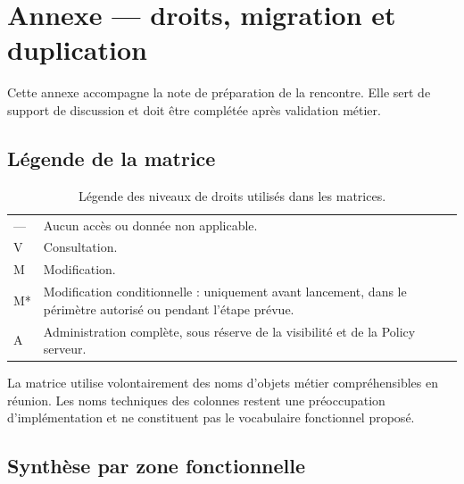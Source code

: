 \section{Annexe — droits, migration et duplication}

Cette annexe accompagne la note de préparation de la rencontre. Elle sert de support de discussion et doit être complétée après validation métier.

\subsection{Légende de la matrice}

\begin{table}[htbp]
\centering
\small
\begin{tabularx}{0.8\textwidth}{>{\centering\arraybackslash}p{1.2cm}Y}
\toprule
{}
 &  \\
\midrule
— & Aucun accès ou donnée non applicable. \\
V & Consultation. \\
M & Modification. \\
M* & Modification conditionnelle : uniquement avant lancement, dans le périmètre autorisé ou pendant l'étape prévue. \\
A & Administration complète, sous réserve de la visibilité et de la Policy serveur. \\
\bottomrule
\end{tabularx}
\caption{Légende des niveaux de droits utilisés dans les matrices.}
\label{tab:legende-droits}
\end{table}

La matrice utilise volontairement des noms d'objets métier compréhensibles en réunion. Les noms techniques des colonnes restent une préoccupation d'implémentation et ne constituent pas le vocabulaire fonctionnel proposé.

\subsection{Synthèse par zone fonctionnelle}

